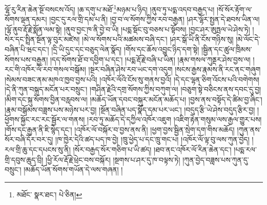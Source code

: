 ལྷོ་རུ་རིན་ཆེན་སྔོ་བསངས་འོད། །ཆ་དགུ་པ་མཐོ་\footnote{མཐོང་  སྣར་ཐང་།  པེ་ཅིན། }མཉམ་པ་ཉིད། །ནུབ་ཏུ་པདྨ་འདབ་བརྒྱད་པ། །སོ་སོར་རྟོག་ལ་སོགས་ལྡན་དམར། །བྱང་དུ་རལ་གྲི་དམ་པ་ནི། །བྱ་བ་ལ་སོགས་ཀྱིས་རབ་བརྒྱན། །ཤར་ལྷོར་སྤྱན་དེ་ཐབས་ཡིན་ལ། །ལྷོ་ནུབ་རྡོ་རྗེ་སྨོན་ལམ་སྟེ། །ནུབ་བྱང་ཁ་ནི་བྱེ་བ་ཡི། །པདྨ་སྡོང་བུ་བཅས་པ་སྟོབས། །བྱང་ཤར་ཨུཏྤལ་ཡེ་ཤེས་ཏེ། །སེར་དང་སྤྲིན་སྔོན་ལྟ་བུར་མཛེས། །མེ་ལ་སོགས་པའི་མཚམས་བཞི་དང་། །ཤར་སྒོ་ཡི་ནི་ངོས་གཉིས་སུ། །མེ་ལོང་དེ་བཞིན་པི་ཝང་དང་། །དྲི་ཡི་དུང་དང་བཅུད་ལེན་སྣོད། །གོས་དང་ཆོས་འབྱུང་ཉིད་དག་སྟེ། །སྦྱིན་དང་ཚུལ་ཁྲིམས་སོགས་པས་བརྒྱན། །དད་སོགས་ཐོ་བ་དབྱིག་པ་དང་། །པདྨ་རྡོ་རྗེ་བཞི་པ་ཡིན། །རྣམ་གསལ་ཀུནྡར་ཤེས་བྱས་ལ། །རང་གི་འཁོར་ལོ་རབ་གསལ་བསྒོམ། །སྔར་བཞིན་ཤེས་རབ་ཡང་དག་འདུག །སངས་རྒྱས་རྣམས་ནི་རང་ནང་གཞུག །སེམས་བཟང་ནམ་མཁའ་ཁྱབ་བྱས་པའི། །འཁོར་ལོའི་ངོས་སུ་གནས་བྱའོ། །དེ་དང་ལྷན་ཅིག་འོངས་པའི་བགེགས། །དེ་ནི་ཀུན་བསྐྲད་མངོན་པར་བསྲུང་། །གཤིན་རྗེའི་དགྲ་སོགས་ཀྱིས་བཀུག་ལ། །བཅུག་སྟེ་བཅིངས་ནས་དབང་དུ་བྱ། །མིག་དང་སྐུ་སོགས་བྱིན་བརླབས་ལ། །མཆོད་ཡོན་དབང་བསྐུར་མངོན་མཆོད་པ། །བྱས་ནས་བསྟོད་དེ་ཚིམ་བྱ་ཞིང་། །རྣམ་བསྒོམས་བཟླས་པས་མཉེས་པར་བྱ། །སྔོན་བཞིན་པད་སྣོད་དམ་པར་ཡང་། །བདུད་རྩི་ཡེ་ཤེས་བདུད་རྩིར་བྱ། །ཕྱོགས་སྐྱོང་རང་རང་སྦྱོར་ལ་གནས། །རབ་ཏུ་མཆོད་དེ་དཀྱིལ་འཁོར་འཇུག །འཇིག་རྟེན་གསུམ་ལས་རྒྱལ་གྱུར་པས། །གོས་དང་རྒྱན་ནི་ཇི་སྙེད་དང་། །འཁོར་ལོ་བསྐོར་བ་བྱས་ནས་ནི། །ཕྱག་བྱས་སྦྱིན་སྲེག་དག་གིས་མཆོད། །ཀུན་ནས་སོར་བཞི་དོར་བར་དུ། །ཁ་ཁྱེར་དེའི་ཚད་པད་ཁ་བྱེ། །ཁྲུ་ཕྱེད་པ་དང་ཁྲུ་གང་པ། །འཁོར་ལོ་ལྟ་བུ་ལས་ཀུན་བྱེད། །རལ་གྲི་ཆུ་དང་དཔངས་སུ་ནི། །སོར་བརྒྱད་སོར་གཅིག་པ་ཡི་ཚད། །ཐབ་ནང་འཁོར་ལོ་རིན་ཆེན་དང་། །པདྨ་རལ་གྲི་དབུས་ཆུད་བྲི། །ཕྱི་རོལ་རྡོ་རྗེ་ཕྲེང་བས་བསྐོར། །སྔགས་པ་ཤར་དུ་ཁ་བལྟས་ཏེ། །ཀུན་བྱེད་བཟླས་པས་ཀུན་དུ་བསྲུང་། །མཆོད་ཡོན་སོགས་གཡོན་དེ་ལས་གཞན། །
